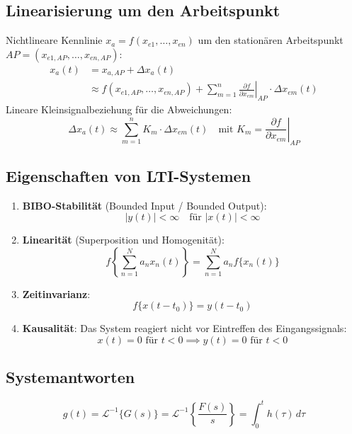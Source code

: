 \subsection{Linearisierung um den Arbeitspunkt}
\begin{tcolorbox}
Nichtlineare Kennlinie $x_a = f(x_{e1}, \dots, x_{en})$ um den stationären Arbeitspunkt $AP = (x_{e1,AP}, \dots, x_{en,AP})$:
\begin{align*}
x_a(t) &= x_{a,AP} + \Delta x_a(t) \\
&\approx f(x_{e1,AP}, \dots, x_{en,AP}) + \sum_{m=1}^n \left. \frac{\partial f}{\partial x_{em}} \right|_{AP} \cdot \Delta x_{em}(t)
\end{align*}
Lineare Kleinsignalbeziehung für die Abweichungen:
\[
\Delta x_a(t) \approx \sum_{m=1}^n K_m \cdot \Delta x_{em}(t) \quad \text{mit } K_m = \left. \frac{\partial f}{\partial x_{em}} \right|_{AP}
\]
\end{tcolorbox}

\subsection{Eigenschaften von LTI-Systemen}
\begin{tcolorbox}
\begin{enumerate}
  \item \textbf{BIBO-Stabilität} (Bounded Input / Bounded Output):
  \[
  |y(t)| < \infty \quad \text{für } |x(t)| < \infty
  \]
  \item \textbf{Linearität} (Superposition und Homogenität):
  \[
  f\left\{ \sum_{n=1}^N a_n x_n(t) \right\} = \sum_{n=1}^N a_n f\{x_n(t)\}
  \]
  \item \textbf{Zeitinvarianz}:
  \[
  f\{x(t - t_0)\} = y(t - t_0)
  \]
  \item \textbf{Kausalität}: Das System reagiert nicht vor Eintreffen des Eingangssignals:
  \[
  x(t) = 0 \text{ für } t < 0 \implies y(t) = 0 \text{ für } t < 0
  \]
\end{enumerate}
\end{tcolorbox}

\subsection{Systemantworten}
\begin{tcolorbox}
\[
g(t) = \mathcal{L}^{-1}\{G(s)\} = \mathcal{L}^{-1}\left\{ \frac{F(s)}{s} \right\} = \int_0^t h(\tau) \, d\tau
\]
\end{tcolorbox}

